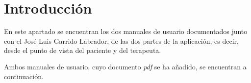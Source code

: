 
\section{Introducción}

En este apartado se encuentran los dos manuales de usuario documentados junto con el José Luis Garrido Labrador, de las dos partes de la aplicación, es decir, desde el punto de vista del paciente y del terapeuta.

Ambos manuales de usuario, cuyo documento \textit{pdf} se ha añadido, se encuentran a continuación.



